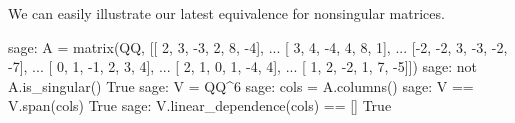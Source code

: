 We can easily illustrate our latest equivalence for nonsingular matrices.
%
%
\begin{sageexample}
sage: A = matrix(QQ, [[ 2,  3, -3,  2,  8, -4],
...                   [ 3,  4, -4,  4,  8,  1],
...                   [-2, -2,  3, -3, -2, -7],
...                   [ 0,  1, -1,  2,  3,  4],
...                   [ 2,  1,  0,  1, -4,  4],
...                   [ 1,  2, -2,  1,  7, -5]])
sage: not A.is_singular()
True
sage: V = QQ^6
sage: cols = A.columns()
sage: V == V.span(cols)
True
sage: V.linear_dependence(cols) == []
True
\end{sageexample}
%
%
\begin{sageverbatim}
\end{sageverbatim}
%

